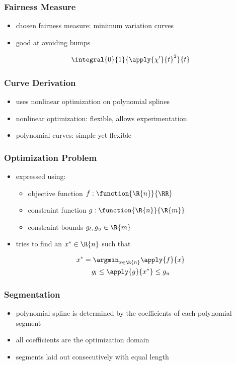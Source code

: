 \documentclass{beamer}
\begin{document}
		\begin{frame}
			\frametitle{Fairness Measure}
			\begin{itemize}
				\item chosen fairness measure: minimum variation curves
				\item good at avoiding bumps
			\end{itemize}
			 \begin{equation*}
				 \integral{0}{1}{\apply{\chi'}{t}^2}{t}
			 \end{equation*}
		\end{frame}
		
		\begin{frame}
			\frametitle{Curve Derivation}
			\begin{itemize}
				\item uses nonlinear optimization on polynomial splines
				\item nonlinear optimization: flexible, allows experimentation
				\item polynomial curves: simple yet flexible %
			\end{itemize}
		\end{frame}
		
		\begin{frame}
			\frametitle{Optimization Problem}
			\begin{itemize}
				\item expressed using:
				\begin{itemize}
					\item objective function \(f : \function{\R{n}}{\RR}\)
					\item constraint function \(g : \function{\R{n}}{\R{m}}\)
					\item constraint bounds \(g_l, g_u \in \R{m}\)
				\end{itemize} 
				\item tries to find an \(x^* \in \R{n}\) such that 
			\end{itemize}
			\begin{equation*}
				\begin{gathered}
					x^* = \argmin_{x \in \R{n}} \apply{f}{x}\\
					g_l \leq \apply{g}{x^*} \leq g_u
				\end{gathered}
			\end{equation*}
		\end{frame}
		
		
		\begin{frame}
			\frametitle{Segmentation}
			\begin{itemize}
				\item polynomial spline is determined by the coefficients of each polynomial segment
				\item all coefficients are the optimization domain
				\item segments laid out consecutively with equal length
			\end{itemize}
		\end{frame}
		
		\begin{frame}
			\frametitle{}
			\begin{itemize}
			\end{itemize}
		\end{frame}
		
\end{document}
